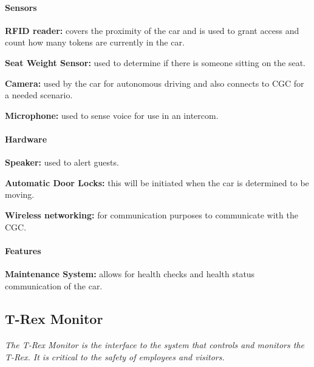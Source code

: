 \documentclass[12pt]{article}
\begin{document}
	\paragraph{Sensors}
	\begin{list}{}{}
		\item \textbf{RFID reader: }covers the proximity of the car and is used 
		to grant access and count how many tokens are currently in the car. 
		\item \textbf{Seat Weight Sensor: }used to determine if there is someone 
		sitting on the seat. 
		\item \textbf{Camera: }used by the car for autonomous driving and also 
		connects to CGC for a needed scenario. 
		\item \textbf{Microphone: }used to sense voice for use in an intercom.
	\end{list}
		
	\paragraph{Hardware}
	\begin{list}{}{}
		\item \textbf{Speaker: }used to alert guests.
		\item \textbf{Automatic Door Locks: }this will be initiated when the car 
		is determined to be moving.
		\item \textbf{Wireless networking: }for communication purposes to communicate 
		with the CGC.
	\end{list}
	
	\paragraph{Features}
	\begin{list}{}{}
		\item \textbf{Maintenance System: }allows for health checks and health status 
		communication of the car.  
	\end{list}

	\subsection{T-Rex Monitor}
	\paragraph{} \textit{ The T-Rex Monitor is the interface to the system that controls 
	and monitors the T-Rex. It is critical to the safety of employees and visitors. }
		
\end{document}
